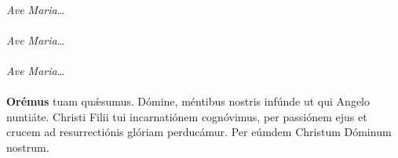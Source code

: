 \\[1mm]
\textit{Ave Maria}\ldots\\[1mm]
\\[1mm]
\textit{Ave Maria}\ldots\\[1mm]
\\[1mm]
\textit{Ave Maria}\ldots\\[1mm]
\\[2mm]
\textbf{Orémus}
 tuam qu{\'\ae}sumus. Dómine, méntibus nostris infúnde ut qui Angelo nuntiáte.
Christi Filii tui incarnatiónem cognóvimus, per passiónem ejus et crucem ad resurrectiónis glóriam perducámur.
Per eúmdem Christum Dóminum nostrum.\\[1mm]
